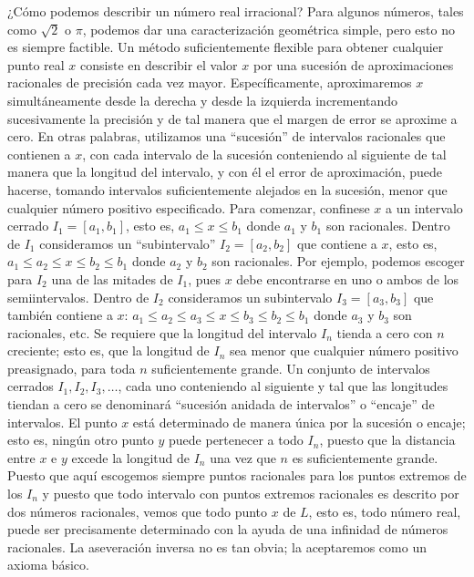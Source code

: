\documentclass[12pt]{book}
\theoremstyle{definition}
\begin{document}
¿Cómo podemos describir un número real irracional? Para algunos números, tales como $\sqrt{2}$ o $\pi$, podemos dar una caracterización geométrica simple, pero esto no es siempre factible. Un método suficientemente flexible para obtener cualquier punto real $x$ consiste en describir el valor $x$ por una sucesión de aproximaciones racionales de precisión cada vez mayor. Específicamente, aproximaremos $x$ simultáneamente desde la derecha y desde la izquierda incrementando sucesivamente la precisión y de tal manera que el margen de error se aproxime a cero. En otras palabras, utilizamos una ``sucesión'' de intervalos racionales que contienen a $x$, con cada intervalo de la sucesión conteniendo al siguiente de tal manera que la longitud del intervalo, y con él el error de aproximación, puede hacerse, tomando intervalos suficientemente alejados en la sucesión, menor que cualquier número positivo especificado. Para comenzar, confinese $x$ a un intervalo cerrado $I_1 = [a_1, b_1]$, esto es, $a_1 \le x \le b_1$ donde $a_1$ y $b_1$ son racionales. Dentro de $I_1$ consideramos un ``subintervalo'' $I_2 = [a_2, b_2]$ que contiene a $x$, esto es, $a_1 \le a_2 \le x \le b_2 \le b_1$ donde $a_2$ y $b_2$ son racionales. Por ejemplo, podemos escoger para $I_2$ una de las mitades de $I_1$, pues $x$ debe encontrarse en uno o ambos de los semiintervalos. Dentro de $I_2$ consideramos un subintervalo $I_3 = [a_3, b_3]$ que también contiene a $x$: $a_1 \le a_2 \le a_3 \le x \le b_3 \le b_2 \le b_1$ donde $a_3$ y $b_3$ son racionales, etc. Se requiere que la longitud del intervalo $I_n$ tienda a cero con $n$ creciente; esto es, que la longitud de $I_n$ sea menor que cualquier número positivo preasignado, para toda $n$ suficientemente grande. Un conjunto de intervalos cerrados $I_1, I_2, I_3, \dots$, cada uno conteniendo al siguiente y tal que las longitudes tiendan a cero se denominará ``sucesión anidada de intervalos'' o ``encaje'' de intervalos. El punto $x$ está determinado de manera única por la sucesión o encaje; esto es, ningún otro punto $y$ puede pertenecer a todo $I_n$, puesto que la distancia entre $x$ e $y$ excede la longitud de $I_n$ una vez que $n$ es suficientemente grande. Puesto que aquí escogemos siempre puntos racionales para los puntos extremos de los $I_n$ y puesto que todo intervalo con puntos extremos racionales es descrito por dos números racionales, vemos que todo punto $x$ de $L$, esto es, todo número real, puede ser precisamente determinado con la ayuda de una infinidad de números racionales. La aseveración inversa no es tan obvia; la aceptaremos como un axioma básico.
\end{document}
